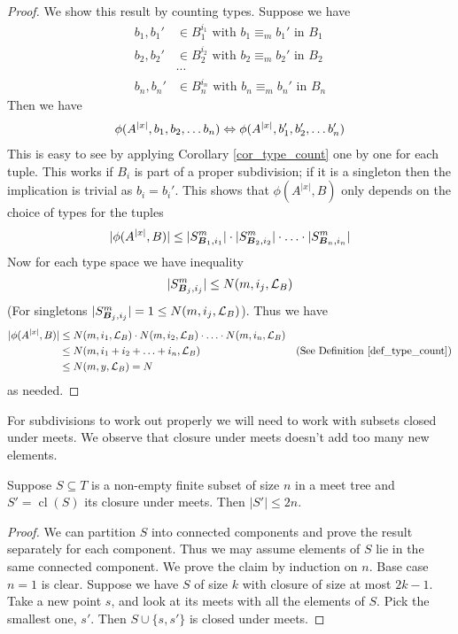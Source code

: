\documentclass{amsart}
\DeclareMathOperator{\B}{\boldface B}
\DeclareMathOperator{\cl}{cl}
\begin{document}
\begin{proof}
	We show this result by counting types. Suppose we have
	\begin{align*}
		b_1, b_1' &\in B_1^{i_1} \text{ with } b_1 \equiv_m b_1' \text { in } B_1 \\
		b_2, b_2' &\in B_2^{i_2} \text{ with } b_2 \equiv_m b_2' \text { in } B_2 \\
		&\cdots \\
		b_n, b_n' &\in B_n^{i_n} \text{ with } b_n \equiv_m b_n' \text { in } B_n
	\end{align*}
	Then we have
	\begin{align*}
		\phi(A^{|x|}, b_1, b_2, \ldots b_n) \Leftrightarrow \phi(A^{|x|}, b_1', b_2', \ldots b_n')
	\end{align*}
	This is easy to see by applying Corollary \ref{cor_type_count} one by one for each tuple. This works if $B_i$ is part of a proper subdivision; if it is a singleton then the implication is trivial as $b_i = b_i'$.
	This shows that $\phi(A^{|x|}, B)$ only depends on the choice of types for the tuples
	\begin{align*}
		|\phi(A^{|x|}, B)| \leq |S^m_{\B_1, i_1}| \cdot |S^m_{\B_2, i_2}| \cdot \ldots \cdot |S^m_{\B_n, i_n}|
	\end{align*}
	Now for each type space we have inequality
	\begin{align*}
		|S^m_{\B_j, i_j}| \leq N(m, i_j, \LL_B)
	\end{align*}
	(For singletons $|S^m_{\B_j, i_j}| = 1 \leq N(m, i_j, \LL_B)$). Thus we have
	\begin{align*}
		|\phi(A^{|x|}, B)| &\leq N(m, i_1, \mathcal L_B) \cdot N(m, i_2, \mathcal L_B) \cdot \ldots \cdot N(m, i_n, \mathcal L_B) \\
		&\leq N(m, i_1+i_2+ \ldots + i_n, \mathcal L_B) &\text{(See Definition \ref{def_type_count})} \\
		&\leq N(m, y, \mathcal L_B) = N
	\end{align*}
	as needed.
\end{proof}

For subdivisions to work out properly we will need to work with subsets closed under meets. We observe that closure under meets doesn't add too many new elements.

\begin{Lemma} \label{lm_meet}
	Suppose $S \subseteq T$ is a non-empty finite subset of size $n$ in a meet tree and $S' = \cl(S)$ its closure under meets. Then $|S'| \leq 2n$.
\end{Lemma}
\begin{proof}
	We can partition $S$ into connected components and prove the result separately for each component. Thus we may assume elements of $S$ lie in the same connected component. We prove the claim by induction on $n$. Base case $n = 1$ is clear. Suppose we have $S$ of size $k$ with closure of size at most $2k - 1$. Take a new point $s$, and look at its meets with all the elements of $S$. Pick the smallest one, $s'$. Then $S \cup \{s, s'\}$ is closed under meets.
\end{proof}
\end{document}
